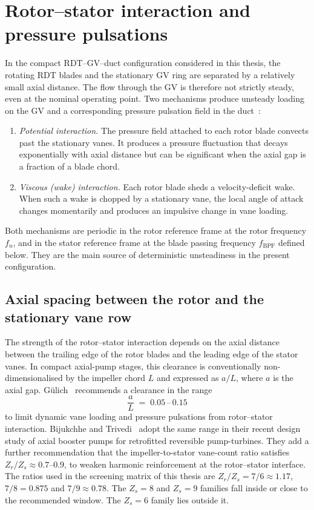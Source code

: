 \section{Rotor--stator interaction and pressure pulsations}
\label{sec:rsi}
 
In the compact RDT--GV--duct configuration considered in this thesis, the rotating RDT blades and the stationary GV ring are separated by a relatively small axial distance. The flow through the GV is therefore not strictly steady, even at the nominal operating point. Two mechanisms produce unsteady loading on the GV and a corresponding pressure pulsation field in the duct~\cite{Brekke2015, Arndt1990}:
\begin{enumerate}
  \item \emph{Potential interaction.} The pressure field attached to each rotor blade convects past the stationary vanes. It produces a pressure fluctuation that decays exponentially with axial distance but can be significant when the axial gap is a fraction of a blade chord.
  \item \emph{Viscous (wake) interaction.} Each rotor blade sheds a velocity-deficit wake. When such a wake is chopped by a stationary vane, the local angle of attack changes momentarily and produces an impulsive change in vane loading.
\end{enumerate}
Both mechanisms are periodic in the rotor reference frame at the rotor frequency $f_n$, and in the stator reference frame at the blade passing frequency $f_{\mathrm{BPF}}$ defined below. They are the main source of deterministic unsteadiness in the present configuration.

\subsection{Axial spacing between the rotor and the stationary vane row}
\label{sec:rsi-axial-spacing}

The strength of the rotor--stator interaction depends on the axial distance between the trailing edge of the rotor blades and the leading edge of the stator vanes. In compact axial-pump stages, this clearance is conventionally non-dimensionalised by the impeller chord $L$ and expressed as $a/L$, where $a$ is the axial gap. G\"ulich~\cite{Gulich2010} recommends a clearance in the range
\begin{equation}
    \frac{a}{L} \;=\; 0.05\,\text{--}\,0.15
    \label{eq:gulich_a_over_L}
\end{equation}
to limit dynamic vane loading and pressure pulsations from rotor--stator interaction. Bijukchhe and Trivedi~\cite{Bijukchhe2026} adopt the same range in their recent design study of axial booster pumps for retrofitted reversible pump-turbines. They add a further recommendation that the impeller-to-stator vane-count ratio satisfies $Z_r/Z_s \approx 0.7$--$0.9$, to weaken harmonic reinforcement at the rotor--stator interface. The ratios used in the screening matrix of this thesis are $Z_r/Z_s = 7/6 \approx 1.17$, $7/8 = 0.875$ and $7/9 \approx 0.78$. The $Z_s = 8$ and $Z_s = 9$ families fall inside or close to the recommended window. The $Z_s = 6$ family lies outside it.

